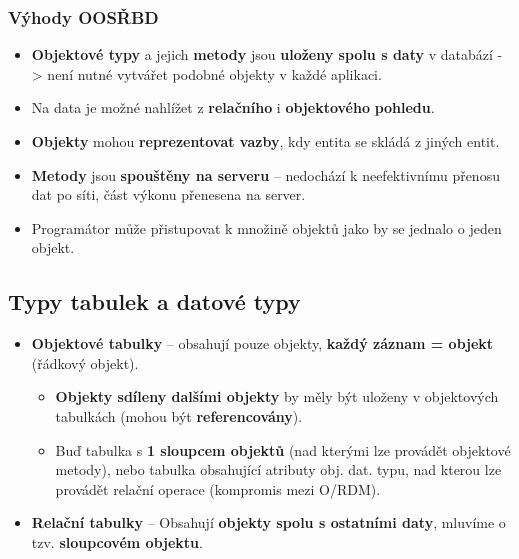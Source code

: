 \subsubsection{Výhody OOSŘBD}
\begin{itemize}
\item \textbf{Objektové typy} a jejich \textbf{metody} jsou \textbf{uloženy spolu s daty} v databází -> není nutné vytvářet podobné objekty v každé aplikaci.
\item Na data je možné nahlížet z \textbf{relačního} i \textbf{objektového} \textbf{pohledu}.
\item \textbf{Objekty} mohou \textbf{reprezentovat vazby}, kdy entita se skládá z jiných entit.
\item \textbf{Metody} jsou \textbf{spouštěny na serveru} -- nedochází k neefektivnímu přenosu dat po síti, část výkonu přenesena na server.
\item Programátor může přistupovat k množině objektů jako by se jednalo o jeden objekt.
\end{itemize}

\subsection{Typy tabulek a datové typy}
\begin{itemize}
\item \textbf{Objektové tabulky} -- obsahují pouze objekty, \textbf{každý záznam = objekt} (řádkový objekt).
\begin{itemize}
	\item \textbf{Objekty sdíleny dalšími objekty} by měly být uloženy v objektových tabulkách (mohou být \textbf{referencovány}).
	\item Buď tabulka s \textbf{1 sloupcem objektů} (nad kterými lze provádět objektové metody), nebo tabulka obsahující atributy obj. dat. typu, nad kterou lze provádět relační operace (kompromis mezi O/RDM).
\end{itemize}

\item \textbf{Relační tabulky} -- Obsahují \textbf{objekty spolu s ostatními daty}, mluvíme o tzv. \textbf{sloupcovém objektu}.
\end{itemize}

